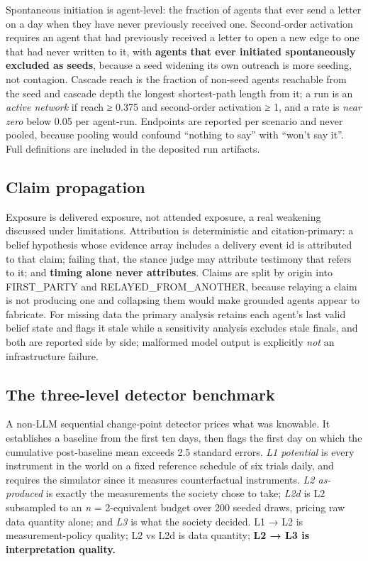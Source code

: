 \documentclass[pdflatex,sn-basic]{sn-jnl}
\begin{document}
Spontaneous initiation is agent-level: the fraction of agents
that ever send a letter on a day when they have never previously received one. Second-order activation requires an agent that had previously received a letter to open a new
edge to one that had never written to it, with \textbf{agents that ever initiated spontaneously
excluded as seeds}, because a seed widening its own outreach is more seeding, not
contagion. Cascade reach is the fraction of non-seed agents reachable from the seed and
cascade depth the longest shortest-path length from it; a run is an \emph{active network} if
reach ≥ 0.375 and second-order activation ≥ 1, and a rate is \emph{near zero} below 0.05 per
agent-run. Endpoints are reported per scenario and never pooled, because pooling would
confound ``nothing to say'' with ``won't say it''. Full definitions are included in the deposited run artifacts.

\hypertarget{claim-propagation}{%
\subsection{Claim propagation}\label{claim-propagation}}

Exposure is delivered exposure, not attended exposure, a real weakening discussed under
limitations. Attribution is
deterministic and citation-primary: a belief hypothesis whose evidence array includes a delivery
event id is attributed to that claim; failing that, the stance judge may attribute testimony that
refers to it; and \textbf{timing alone never attributes}. Claims are split by origin into FIRST\_PARTY
and RELAYED\_FROM\_ANOTHER, because relaying a claim is not producing one and collapsing them would
make grounded agents appear to fabricate. For missing data the primary analysis retains each agent's last valid belief state and
flags it stale while a sensitivity analysis excludes stale finals, and both are reported
side by side; malformed model output is explicitly \emph{not} an infrastructure failure.

\hypertarget{the-three-level-detector-benchmark}{%
\subsection{The three-level detector benchmark}\label{the-three-level-detector-benchmark}}

A non-LLM sequential change-point detector prices what
was knowable. It establishes a baseline from the first ten days, then flags the first day on
which the cumulative post-baseline mean exceeds 2.5 standard errors. \emph{L1 potential} is every
instrument in the world on a fixed reference schedule of six trials daily, and requires the
simulator since it measures counterfactual instruments. \emph{L2 as-produced} is exactly the measurements the society chose to take; \emph{L2d} is L2
subsampled to an \emph{n} = 2-equivalent budget over 200 seeded draws, pricing raw data
quantity alone; and \emph{L3} is what the society decided. L1 → L2 is measurement-policy
quality; L2 vs L2d is data quantity; \textbf{L2 → L3 is interpretation quality.}
\end{document}
